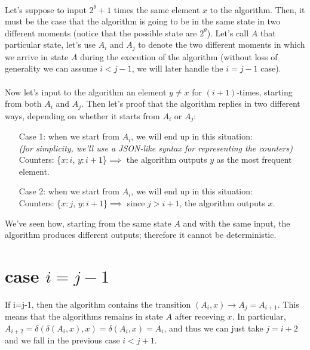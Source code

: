 \documentclass[a4paper]{article}
\begin{document}
\\
Let's suppose to input $2^{\theta}+1$ times the same element $x$ to the algorithm. Then, it must be the case that the algorithm is going to be in the same state in two different moments (notice that the possible state are $2^{\theta}$). Let's call $A$ that particular state, let's use $A_i$ and $A_j$ to denote the two different moments in which we arrive in state $A$ during the execution of the algorithm (without loss of generality we can assume $i < j-1$, we will later handle the $i=j-1$ case).
\\
\\
Now let's input to the algorithm an element $y\neq x$ for $(i+1)$-times, starting from both $A_i$ and $A_j$. Then let's proof that the algorithm replies in two different ways, depending on whether it starts from $A_i$ or $A_j$:
\begin{itemize}
\item[Case 1:] when we start from $A_i$, we will end up in this situation:\\ 
\textit{(for simplicity, we'll use a JSON-like syntax for representing the counters)}\\ Counters: \{$ x : i$,  $ y: i+1$\}$ \implies $ the algorithm outputs $y$ as the most frequent element.
\item[Case 2:] when we start from $A_i$, we will end up in this situation:\\
 Counters: \{$ x : j$,  $ y: i+1$\}$ \implies$ since $j>i+1$, the algorithm outputs $x$.
\end{itemize}
We've seen how, starting from the same state $A$ and with the same input, the algorithm produces different outputs; therefore it cannot be deterministic.

\section*{case $i=j-1$}
If i=j-1, then the algorithm contains the transition $(A_i, x) \rightarrow A_j = A_{i+1}$. This means that the algorithms remains in state $A$ after receving $x$. In particular, $A_{i+2} = \delta (\delta(A_i,x), x) = \delta(A_i, x) = A_i$, and thus we can just take $j=i+2$ and we fall in the previous case $i<j+1$.
\end{document}
